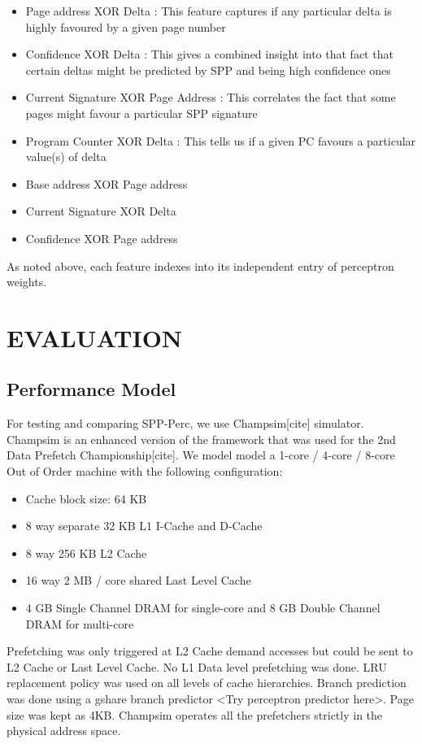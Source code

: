 \documentclass{sig-alternate}
\begin{document}
\begin{itemize}
\item Page address XOR Delta : This feature captures if any particular delta is highly favoured by a given page number
\item Confidence XOR Delta : This gives a combined insight into that fact that certain deltas might be predicted by SPP and being high confidence ones
\item Current Signature XOR Page Address : This correlates the fact that some pages might favour a particular SPP signature
\item Program Counter XOR Delta : This tells us if a given PC favours a particular value(s) of delta
\item Base address XOR Page address
\item Current Signature XOR Delta
\item Confidence XOR Page address
\end{itemize} 
As noted above, each feature indexes into its independent entry of perceptron weights.


\section{EVALUATION}
\subsection{Performance Model}
For testing and comparing SPP-Perc, we use Champsim[cite] simulator. 
Champsim is an enhanced version of the framework that was used for the 2nd Data Prefetch Championship[cite]. 
We model model a 1-core / 4-core / 8-core Out of Order machine with the following configuration:  

\begin{itemize}
    \item Cache block size: 64 KB
    \item 8 way separate 32 KB L1 I-Cache and D-Cache
    \item 8 way 256 KB L2 Cache
    \item 16 way 2 MB / core shared Last Level Cache
    \item 4 GB Single Channel DRAM for single-core and 8 GB Double Channel DRAM for multi-core
\end{itemize}
Prefetching was only triggered at L2 Cache demand accesses but could be sent to L2 Cache or Last Level Cache. 
No L1 Data level prefetching was done. 
LRU replacement policy was used on all levels of cache hierarchies. 
Branch prediction was done using a gshare branch predictor <Try perceptron predictor here>. 
Page size was kept as 4KB. 
Champsim operates all the prefetchers strictly in the physical address space.
\end{document}
